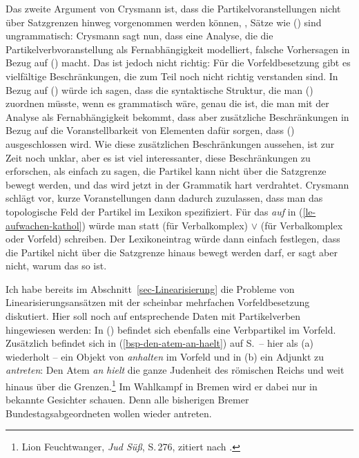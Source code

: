 Das zweite Argument von Crysmann ist, dass die Partikelvoranstellungen
nicht über Satzgrenzen hinweg vorgenommen werden können, \dash, Sätze wie
() sind ungrammatisch:
\z
{}
Crysmann sagt nun, dass eine Analyse, die die Partikelverbvoranstellung als
Fernabhängigkeit modelliert, falsche Vorhersagen in Bezug auf () macht.
Das ist jedoch nicht richtig: Für die Vorfeldbesetzung gibt es vielfältige
Beschränkungen, die zum Teil noch nicht richtig verstanden sind. In Bezug auf ()
würde ich sagen, dass die syntaktische Struktur, die man () zuordnen
müsste, wenn es grammatisch wäre, genau die ist, die man mit der Analyse als
Fernabhängigkeit bekommt, dass aber zusätzliche Beschränkungen in Bezug auf die Voranstellbarkeit
von Elementen dafür sorgen, dass () ausgeschlossen wird.
Wie diese zusätzlichen Beschränkungen aussehen, ist zur Zeit noch unklar, aber
es ist viel interessanter, diese Beschränkungen zu erforschen, als einfach zu sagen,
die Partikel kann nicht über die Satzgrenze bewegt werden, und das wird jetzt in
der Grammatik hart verdrahtet. Crysmann schlägt vor, kurze Voranstellungen
dann dadurch zuzulassen, dass man das topologische Feld der Partikel im Lexikon
spezifiziert. Für das \emph{auf} in (\ref{le-aufwachen-kathol})
würde man statt  (für Verbalkomplex)
 $\vee$  (für Verbalkomplex oder Vorfeld) schreiben.
Der Lexikoneintrag würde dann einfach festlegen, dass die Partikel nicht über die Satzgrenze 
hinaus bewegt werden darf, er sagt aber nicht, warum das so ist.
\largerpage%

Ich habe bereits im Abschnitt~\ref{sec-Linearisierung} die Probleme von Linearisierungsansätzen
mit der scheinbar mehrfachen Vorfeldbesetzung diskutiert. Hier soll noch auf entsprechende
Daten mit Partikelverben hingewiesen werden: In () befindet sich ebenfalls
eine Verbpartikel im Vorfeld. Zusätzlich befindet sich \zb in  (\ref{bsp-den-atem-an-haelt}) auf
S.\,\pageref{bsp-den-atem-an-haelt} -- hier als (a) wiederholt --
ein Objekt von \emph{anhalten} im Vorfeld und in (b) ein Adjunkt zu \emph{antreten}:
\eal
\ex\label{bsp-den-atem-an-haelt-zwei}
Den Atem \emph{an} \emph{hielt} die ganze Judenheit des römischen Reichs und weit hinaus über die Grenzen.\footnote{
        Lion Feuchtwanger, \emph{Jud Süß}, S.\,276, zitiert nach .
}
\ex\label{bsp-wieder-an-tritt}
Im Wahlkampf in Bremen wird er dabei nur in bekannte Gesichter schauen. Denn alle bisherigen Bremer Bundestagsabgeordneten wollen wieder antreten.

